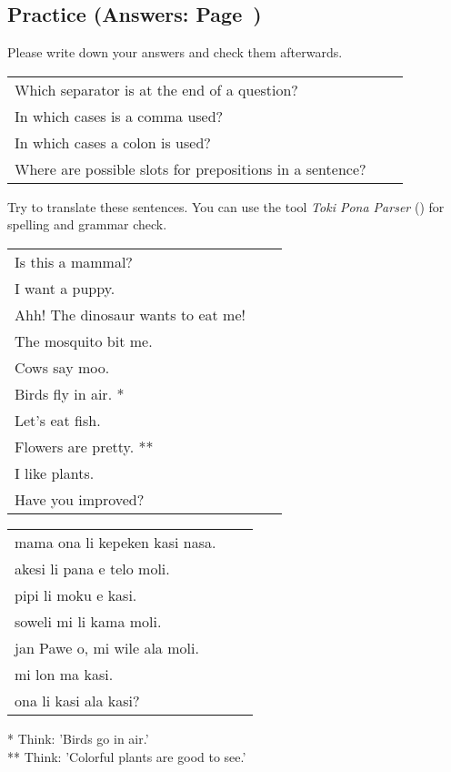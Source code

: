 \subsection*{Practice (Answers: Page~\pageref{'living_things'})}
%
Please write down your answers and check them afterwards. 

\begin{supertabular}{p{5,5cm}|ll}
Which separator is at the end of a question? &&  \\ %
In which cases is a comma used? &&  \\ %
In which cases a colon is used? &&  \\ %
Where are possible slots for prepositions in a sentence? &&  \\ %
\end{supertabular}

Try to translate these sentences. 
You can use the tool \textit{Toki Pona Parser} (\cite{www:rowa:02}) for spelling and grammar check. 

\begin{supertabular}{p{5,5cm}|ll}
Is this a mammal? &&  \\ %
I want a puppy. &&   \\ %
Ahh! The dinosaur wants to eat me!  &&  \\ %
The mosquito bit me.  &&  \\ %
Cows say moo.  &&  \\ %
Birds fly in air. * &&  \\ %
Let's eat fish.  &&  \\ %
Flowers are pretty. ** &&  \\ %
I like plants. &&   \\ %
Have you improved? &&  \\ %
\end{supertabular}

\begin{supertabular}{p{5,5cm}|ll}
mama ona li kepeken kasi nasa.  &&  \\ %
akesi li pana e telo moli. &&  \\  %
pipi li moku e kasi.  &&  \\ %
soweli mi li kama moli.  &&  \\ %
jan Pawe o, mi wile ala moli. && \\   %
mi lon ma kasi. &&   \\ %
ona li kasi ala kasi? &&   \\ %
\end{supertabular} 

* Think: 'Birds go in air.' \\
** Think: 'Colorful plants are good to see.' 
